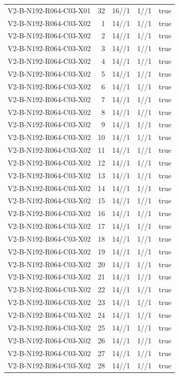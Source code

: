{\begin{longtable}{lrrrr}
V2-B-N192-R064-C03-X01 & 32 & 16//1 & 1//1 & true \\
V2-B-N192-R064-C03-X02 & 1 & 14//1 & 1//1 & true \\
V2-B-N192-R064-C03-X02 & 2 & 14//1 & 1//1 & true \\
V2-B-N192-R064-C03-X02 & 3 & 14//1 & 1//1 & true \\
V2-B-N192-R064-C03-X02 & 4 & 14//1 & 1//1 & true \\
V2-B-N192-R064-C03-X02 & 5 & 14//1 & 1//1 & true \\
V2-B-N192-R064-C03-X02 & 6 & 14//1 & 1//1 & true \\
V2-B-N192-R064-C03-X02 & 7 & 14//1 & 1//1 & true \\
V2-B-N192-R064-C03-X02 & 8 & 14//1 & 1//1 & true \\
V2-B-N192-R064-C03-X02 & 9 & 14//1 & 1//1 & true \\
V2-B-N192-R064-C03-X02 & 10 & 14//1 & 1//1 & true \\
V2-B-N192-R064-C03-X02 & 11 & 14//1 & 1//1 & true \\
V2-B-N192-R064-C03-X02 & 12 & 14//1 & 1//1 & true \\
V2-B-N192-R064-C03-X02 & 13 & 14//1 & 1//1 & true \\
V2-B-N192-R064-C03-X02 & 14 & 14//1 & 1//1 & true \\
V2-B-N192-R064-C03-X02 & 15 & 14//1 & 1//1 & true \\
V2-B-N192-R064-C03-X02 & 16 & 14//1 & 1//1 & true \\
V2-B-N192-R064-C03-X02 & 17 & 14//1 & 1//1 & true \\
V2-B-N192-R064-C03-X02 & 18 & 14//1 & 1//1 & true \\
V2-B-N192-R064-C03-X02 & 19 & 14//1 & 1//1 & true \\
V2-B-N192-R064-C03-X02 & 20 & 14//1 & 1//1 & true \\
V2-B-N192-R064-C03-X02 & 21 & 14//1 & 1//1 & true \\
V2-B-N192-R064-C03-X02 & 22 & 14//1 & 1//1 & true \\
V2-B-N192-R064-C03-X02 & 23 & 14//1 & 1//1 & true \\
V2-B-N192-R064-C03-X02 & 24 & 14//1 & 1//1 & true \\
V2-B-N192-R064-C03-X02 & 25 & 14//1 & 1//1 & true \\
V2-B-N192-R064-C03-X02 & 26 & 14//1 & 1//1 & true \\
V2-B-N192-R064-C03-X02 & 27 & 14//1 & 1//1 & true \\
V2-B-N192-R064-C03-X02 & 28 & 14//1 & 1//1 & true \\

\end{longtable}}
